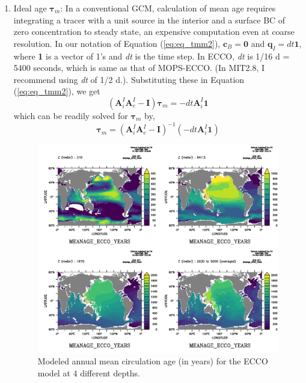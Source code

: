 \documentclass[a4paper]{article}
\begin{document}
\begin{enumerate}[label=(\arabic*)]
\item Ideal age $\boldsymbol{\tau}_m$: In a conventional GCM, calculation of mean age requires integrating a tracer with a unit source in the interior and a surface BC of zero concentration to steady state, an expensive computation even at coarse resolution. In our notation of Equation (\ref{eq:eq_tmm2}), $\mathbf{c}_B = \mathbf{0}$ and $\mathbf{q}_I = dt\mathbf{1}$, where \textbf{1} is a vector of 1's and \textit{dt} is the time step. In ECCO, \textit{dt} is 1/16 d = 5400 seconds, which is same as that of MOPS-ECCO. (In MIT2.8, I recommend using \textit{dt} of 1/2 d.). Substituting these in Equation (\ref{eq:eq_tmm2}), we get 
\begin{equation}
   (\mathbf{A}_i^{I}\mathbf{A}_e^{I}-\mathbf{I})\boldsymbol{\tau}_m = -dt\mathbf{A}_i^{I}\mathbf{1}   \label{eq:eq_tmm3}
\end{equation}
which can be readily solved for $\boldsymbol{\tau}_m$ by,
\begin{equation}
   \boldsymbol{\tau}_m = (\mathbf{A}_i^{I}\mathbf{A}_e^{I}-\mathbf{I})^{-1}(-dt\mathbf{A}_i^{I}\mathbf{1})   \label{eq:eq_tmm4}
\end{equation}

\begin{figure}[h!]   %
   \centering
   \includegraphics[scale=0.65]{meanage_ecco.pdf}
   \caption[]{Modeled annual mean circulation age (in years) for the ECCO model at 4 different depths.}
   \label{fig:meanage_ecco}
\end{figure}


\end{enumerate}
\end{document}
